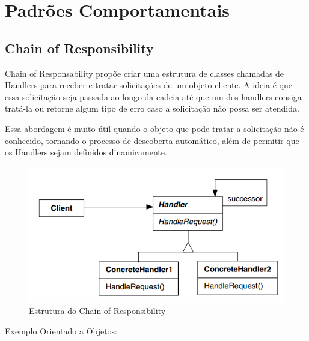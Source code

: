 \chapter{Padrões Comportamentais}

\section{Chain of Responsibility}

Chain of Responsability propõe criar uma estrutura de classes 
chamadas de Handlers para receber e tratar solicitações de um 
objeto cliente. A ideia é que essa solicitação seja passada ao 
longo da cadeia até que um dos handlers consiga tratá-la ou 
retorne algum tipo de erro caso a solicitação não possa ser 
atendida.

Essa abordagem é muito útil quando o objeto que pode tratar 
a solicitação não é conhecido, tornando o processo de 
descoberta automático, além de permitir que os Handlers sejam 
definidos dinamicamente.

\begin{figure}[htb]
	\caption{\label{fig_grafico}Estrutura do Chain of Responsibility}
	\begin{center}
	    \includegraphics[scale=0.5]{5_padroes-contexto-funcional/5.3_comportamentais/5.3.01_chain-of-responsibility/diagram.png}
	\end{center}
\end{figure}

Exemplo Orientado a Objetos:

\begin{lstlisting}[caption={Chain of Responsibility Orientação a Objetos},label=oochresponsibility]


    
\end{lstlisting}

